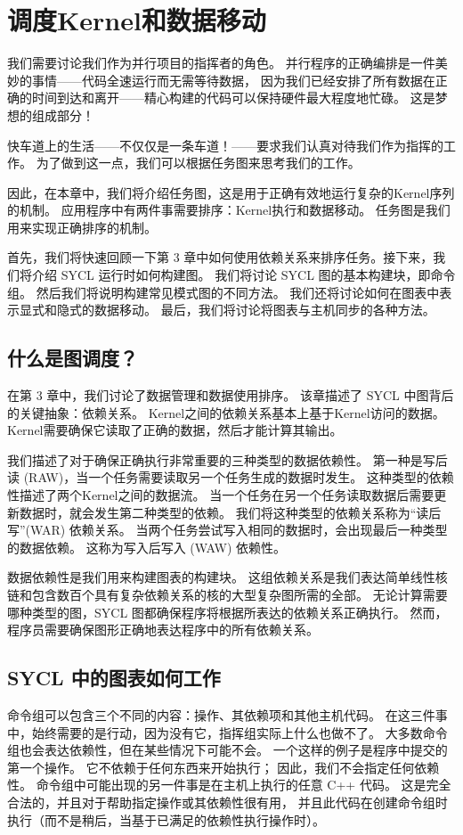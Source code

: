 \section{调度Kernel和数据移动}
我们需要讨论我们作为并行项目的指挥者的角色。 
并行程序的正确编排是一件美妙的事情——代码全速运行而无需等待数据，
因为我们已经安排了所有数据在正确的时间到达和离开——精心构建的代码可以保持硬件最大程度地忙碌。 这是梦想的组成部分！

快车道上的生活——不仅仅是一条车道！——要求我们认真对待我们作为指挥的工作。 
为了做到这一点，我们可以根据任务图来思考我们的工作。

因此，在本章中，我们将介绍任务图，这是用于正确有效地运行复杂的Kernel序列的机制。 
应用程序中有两件事需要排序：Kernel执行和数据移动。 任务图是我们用来实现正确排序的机制。

首先，我们将快速回顾一下第 3 章中如何使用依赖关系来排序任务。接下来，我们将介绍 SYCL 运行时如何构建图。 
我们将讨论 SYCL 图的基本构建块，即命令组。 然后我们将说明构建常见模式图的不同方法。 
我们还将讨论如何在图表中表示显式和隐式的数据移动。 最后，我们将讨论将图表与主机同步的各种方法。


\subsection{什么是图调度？}
在第 3 章中，我们讨论了数据管理和数据使用排序。 该章描述了 SYCL 中图背后的关键抽象：依赖关系。 
Kernel之间的依赖关系基本上基于Kernel访问的数据。 Kernel需要确保它读取了正确的数据，然后才能计算其输出。

我们描述了对于确保正确执行非常重要的三种类型的数据依赖性。 
第一种是写后读 (RAW)，当一个任务需要读取另一个任务生成的数据时发生。 这种类型的依赖性描述了两个Kernel之间的数据流。 
当一个任务在另一个任务读取数据后需要更新数据时，就会发生第二种类型的依赖。 
我们将这种类型的依赖关系称为“读后写”(WAR) 依赖关系。 
当两个任务尝试写入相同的数据时，会出现最后一种类型的数据依赖。 这称为写入后写入 (WAW) 依赖性。

数据依赖性是我们用来构建图表的构建块。 
这组依赖关系是我们表达简单线性核链和包含数百个具有复杂依赖关系的核的大型复杂图所需的全部。 
无论计算需要哪种类型的图，SYCL 图都确保程序将根据所表达的依赖关系正确执行。 
然而，程序员需要确保图形正确地表达程序中的所有依赖关系。

\subsection{SYCL 中的图表如何工作}
命令组可以包含三个不同的内容：操作、其依赖项和其他主机代码。 
在这三件事中，始终需要的是行动，因为没有它，指挥组实际上什么也做不了。 
大多数命令组也会表达依赖性，但在某些情况下可能不会。 一个这样的例子是程序中提交的第一个操作。 
它不依赖于任何东西来开始执行； 因此，我们不会指定任何依赖性。 
命令组中可能出现的另一件事是在主机上执行的任意 C++ 代码。 
这是完全合法的，并且对于帮助指定操作或其依赖性很有用，
并且此代码在创建命令组时执行（而不是稍后，当基于已满足的依赖性执行操作时）。

